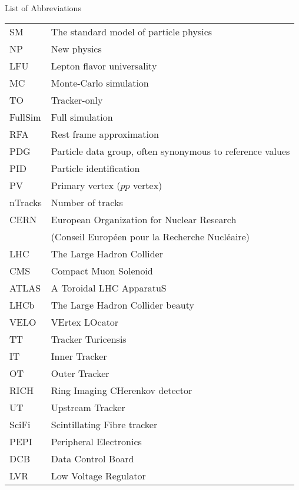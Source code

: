 \singlespacing \normalsize
\hbox{\ }

\vspace{.5in}

\begin{center}
\large{List of Abbreviations}
\end{center}

\vspace{3pt}

\begin{supertabular}{ll}
    SM      & The standard model of particle physics \\
    NP      & New physics \\
    LFU     & Lepton flavor universality \\
    MC      & Monte-Carlo simulation \\
    TO      & Tracker-only \\
    FullSim & Full simulation \\
    RFA     & Rest frame approximation \\
    PDG     & Particle data group, often synonymous to reference values \\
    PID     & Particle identification \\
    PV      & Primary vertex ($pp$ vertex) \\
    nTracks & Number of tracks \\
    CERN    & European Organization for Nuclear Research \\
            & (Conseil Européen pour la Recherche Nucléaire) \\
    LHC     & The Large Hadron Collider \\
    CMS     & Compact Muon Solenoid \\
    ATLAS   & A Toroidal LHC ApparatuS \\
    LHCb    & The Large Hadron Collider beauty \\
    VELO    & VErtex LOcator \\
    TT      & Tracker Turicensis \\
    IT      & Inner Tracker \\
    OT      & Outer Tracker \\
    RICH    & Ring Imaging CHerenkov detector \\
    UT      & Upstream Tracker \\
    SciFi   & Scintillating Fibre tracker \\
    PEPI    & Peripheral Electronics \\
    DCB     & Data Control Board \\
    LVR     & Low Voltage Regulator \\
\end{supertabular}
